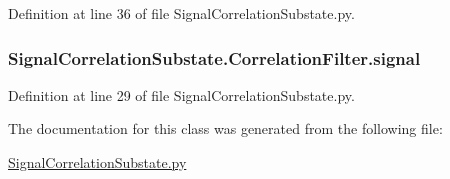 Definition at line 36 of file Signal\+Correlation\+Substate.\+py.

\subsubsection[{\texorpdfstring{signal}{signal}}]{\setlength{\rightskip}{0pt plus 5cm}Signal\+Correlation\+Substate.\+Correlation\+Filter.\+signal}\hypertarget{classSignalCorrelationSubstate_1_1CorrelationFilter_aa8d4b67731322e27598866d1cec84877}{}\label{classSignalCorrelationSubstate_1_1CorrelationFilter_aa8d4b67731322e27598866d1cec84877}


Definition at line 29 of file Signal\+Correlation\+Substate.\+py.



The documentation for this class was generated from the following file\+:\begin{DoxyCompactItemize}
\item 
\hyperlink{SignalCorrelationSubstate_8py}{Signal\+Correlation\+Substate.\+py}\end{DoxyCompactItemize}
